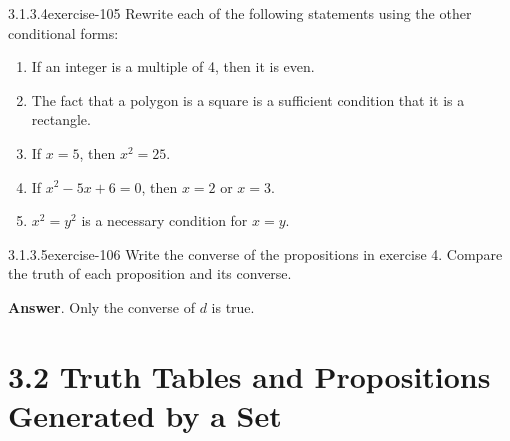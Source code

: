 \documentclass[twoside,10pt,]{book}
\numberwithin{equation}{section}
\begin{document}
\begin{divisionsolution}{3.1.3.4}{}{exercise-105}%
\hypertarget{p-928}{}%
Rewrite each of the following statements using the other conditional forms:%
\par
\hypertarget{p-929}{}%
\leavevmode%
\begin{enumerate}[label=(\alph*)]
\item\hypertarget{li-519}{}\hypertarget{p-930}{}%
If an integer is a multiple of 4, then it is even.%
\item\hypertarget{li-520}{}\hypertarget{p-931}{}%
The fact that a polygon is a square is a sufficient condition that it is a rectangle.%
\item\hypertarget{li-521}{}\hypertarget{p-932}{}%
If \(x = 5\), then \(x^2=25\).%
\item\hypertarget{li-522}{}\hypertarget{p-933}{}%
If \(x^2 - 5x + 6 = 0\), then \(x = 2\) or \(x = 3\).%
\item\hypertarget{li-523}{}\hypertarget{p-934}{}%
\(x^2=y^2\) is a necessary condition for \(x = y\).%
\end{enumerate}
%
\end{divisionsolution}%
\begin{divisionsolution}{3.1.3.5}{}{exercise-106}%
\hypertarget{p-935}{}%
Write the converse of the propositions in exercise 4. Compare the truth of each proposition and its converse.%
\par\smallskip%
\noindent\textbf{Answer}.\quad%
\hypertarget{p-936}{}%
Only the converse of \(d\) is true.%
\end{divisionsolution}%
\section*{3.2 Truth Tables and Propositions Generated by a Set}
\end{document}

